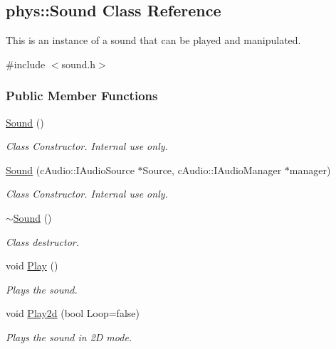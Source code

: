 \hypertarget{classphys_1_1Sound}{
\subsection{phys::Sound Class Reference}
\label{dc/d2f/classphys_1_1Sound}
}


This is an instance of a sound that can be played and manipulated.  




{\ttfamily \#include $<$sound.h$>$}

\subsubsection*{Public Member Functions}
\begin{DoxyCompactItemize}
\item 
\hyperlink{classphys_1_1Sound_a6a9d4b475da9453c9b02ca2c49a6fa76}{Sound} ()
\begin{DoxyCompactList}\small\item\em Class Constructor. Internal use only. \item\end{DoxyCompactList}\item 
\hyperlink{classphys_1_1Sound_a0452d6079bcb201f9d2f3b2742eb21b6}{Sound} (cAudio::IAudioSource $\ast$Source, cAudio::IAudioManager $\ast$manager)
\begin{DoxyCompactList}\small\item\em Class Constructor. Internal use only. \item\end{DoxyCompactList}\item 
\hyperlink{classphys_1_1Sound_ad49df56479e003d0990a5dcb1c506d39}{$\sim$Sound} ()
\begin{DoxyCompactList}\small\item\em Class destructor. \item\end{DoxyCompactList}\item 
void \hyperlink{classphys_1_1Sound_ae7caa90deb9e5a4cab2d5ada27f5e5b5}{Play} ()
\begin{DoxyCompactList}\small\item\em Plays the sound. \item\end{DoxyCompactList}\item 
void \hyperlink{classphys_1_1Sound_a853bb9a2c1b41cd82a385608614861e7}{Play2d} (bool Loop=false)
\begin{DoxyCompactList}\small\item\em Plays the sound in 2D mode. \item\end{DoxyCompactList}\item 

\end{DoxyCompactItemize}
